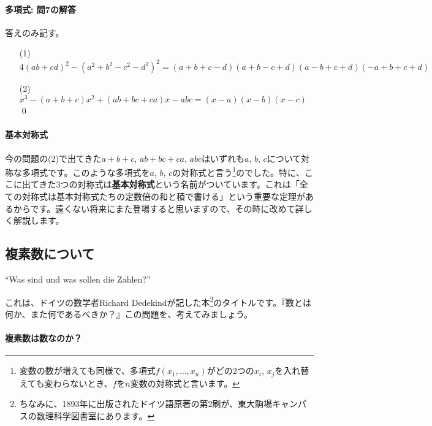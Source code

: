 \paragraph{多項式: 問7の解答} 答えのみ記す。
\begin{itemize}
\item[(1)] %
$4(ab+cd)^2-(a^2+b^2-c^2-d^2)^2
= (a+b+c-d)(a+b-c+d)(a-b+c+d)(-a+b+c+d)$
\item[(2)] $x^3-(a+b+c)x^2+(ab+bc+ca)x-abc = (x-a)(x-b)(x-c)$ \qed
\end{itemize}

\paragraph{基本対称式}

今の問題の(2)で出てきた$a+b+c$, $ab+bc+ca$, $abc$はいずれも$a$, $b$, $c$について対称な多項式です。このような多項式を$a$, $b$, $c$の対称式と言う\footnote{変数の数が増えても同様で、多項式$f(x_1,\ldots,x_n)$がどの$2$つの$x_i$, $x_j$を入れ替えても変わらないとき、$f$を$n$変数の対称式と言います。}のでした。特に、ここに出てきた$3$つの対称式は\textbf{基本対称式}という名前がついています。これは「全ての対称式は基本対称式たちの定数倍の和と積で書ける」という重要な定理があるからです。遠くない将来にまた登場すると思いますので、その時に改めて詳しく解説します。

\subsection{複素数について}
\begin{citation}
{}``Was sind und was sollen die Zahlen?''
\end{citation}

これは、ドイツの数学者Richard Dedekindが記した本\footnote{ちなみに、1893年に出版されたドイツ語原著の第2刷が、東大駒場キャンパスの数理科学図書室にあります。}のタイトルです。『数とは何か、また何であるべきか？』この問題を、考えてみましょう。

\paragraph{複素数は数なのか？}


